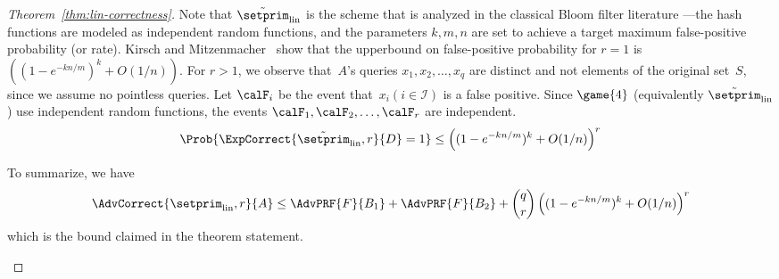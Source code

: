 \begin{proof}[Theorem~\ref{thm:lin-correctness}]
Note that $\tilde{\setprim}_{\mathrm{lin}}$ is the scheme that is analyzed in the classical Bloom filter literature ---the hash functions are modeled as independent random functions, and the parameters $k,m,n$  are set to achieve a target maximum false-positive probability (or rate).  Kirsch and Mitzenmacher~\cite{kirsch2006less} show that the upperbound on false-positive probability for $r=1$ is $\left( (1-e^{-kn/m})^k + O(1/n) \right)$.  For $r>1$, we observe that~$A$'s queries $x_1,x_2,\ldots,x_q$ are distinct and not elements of the original set~$S$, since we assume no pointless queries. Let $\calF_i$ be the event that~$x_i(i \in \mathcal{I})$ is a false positive.  Since $\game{4}$ (equivalently $\tilde{\setprim}_{\mathrm{lin}}$) use independent random functions, the events $\calF_1,\calF_2,\ldots,\calF_r$ are independent. 
\[
\Prob{\ExpCorrect{\tilde{\setprim}_{\mathrm{lin}},r}{D} = 1}\leq \left( (1-e^{-kn/m})^k + O(1/n) \right)^r 
\]

To summarize, we have 
\[
\AdvCorrect{\setprim_{\mathrm{lin}},r}{A}  \leq  \AdvPRF{F}{B_1} +\AdvPRF{F}{B_2} +\dbinom{q}{r}\left( (1-e^{-kn/m})^k + O(1/n) \right)^r
\]
which is the bound claimed in the theorem statement. %

\begin{figure}[tp]
\end{figure}
\end{proof}
